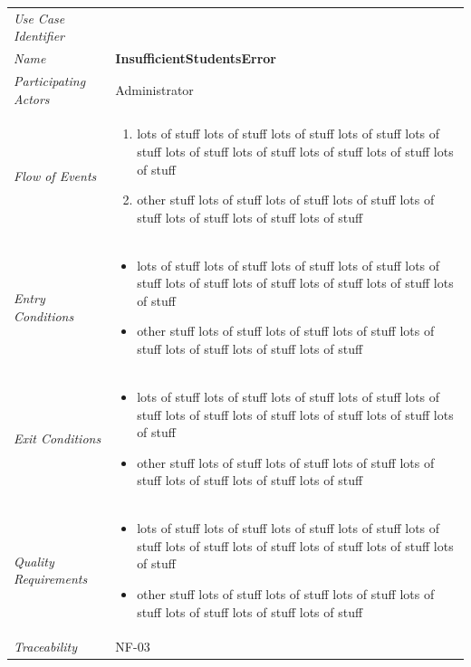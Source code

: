 \documentclass[12pt,letterpaper]{article}
\begin{document}
\begin{center}
	\begin{tabu} to 
		\toprule
		Use Case Identifier & \insufficientstudentserror{} \\
		Name & {\bf InsufficientStudentsError} \\
		Participating Actors & Administrator \\
		Flow of Events & 
	    \begin{enumerate}[topsep=-1em]
		    \item lots of stuff lots of stuff lots of stuff lots of stuff lots of stuff lots of stuff lots of stuff lots of stuff lots of stuff lots of stuff
		    \item other stuff lots of stuff lots of stuff lots of stuff lots of stuff lots of stuff lots of stuff lots of stuff
		\end{enumerate} \\

		Entry Conditions &
		\begin{itemize}[topsep=-1em]
		    \item lots of stuff lots of stuff lots of stuff lots of stuff lots of stuff lots of stuff lots of stuff lots of stuff lots of stuff lots of stuff
		    \item other stuff lots of stuff lots of stuff lots of stuff lots of stuff lots of stuff lots of stuff lots of stuff
        \end{itemize} \\

		Exit Conditions &
		\begin{itemize}[topsep=-1em]
		    \item lots of stuff lots of stuff lots of stuff lots of stuff lots of stuff lots of stuff lots of stuff lots of stuff lots of stuff lots of stuff
		    \item other stuff lots of stuff lots of stuff lots of stuff lots of stuff lots of stuff lots of stuff lots of stuff
        \end{itemize} \\

		Quality Requirements &
		\begin{itemize}[topsep=-1em]
		    \item lots of stuff lots of stuff lots of stuff lots of stuff lots of stuff lots of stuff lots of stuff lots of stuff lots of stuff lots of stuff
		    \item other stuff lots of stuff lots of stuff lots of stuff lots of stuff lots of stuff lots of stuff lots of stuff
        \end{itemize} \\

		Traceability & NF-03 \\
		\toprule
	\end{tabu}
\end{center}
\end{document}
